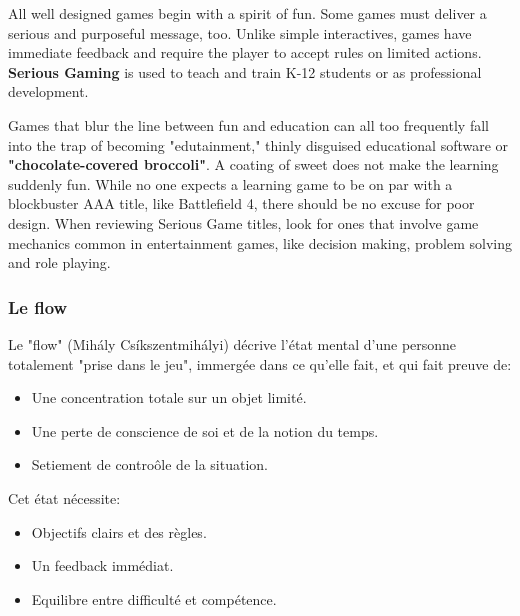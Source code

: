 All well designed games begin with a spirit of fun. Some games must deliver a serious and purposeful message, too. Unlike simple interactives, games have immediate feedback and require the player to accept rules on limited actions. \textbf{Serious Gaming} is used to teach and train K-12 students or as professional development. 

Games that blur the line between fun and education can all too frequently fall into the trap of becoming "edutainment," thinly disguised educational software or \textbf{"chocolate-covered broccoli"}. A coating of sweet does not make the learning suddenly fun. While no one expects a learning game to be on par with a blockbuster AAA title, like Battlefield 4, there should be no excuse for poor design. When reviewing Serious Game titles, look for ones that involve game mechanics common in entertainment games, like decision making, problem solving and role playing.

\subsubsection{Le flow}

Le "flow" (Mih\'aly Cs\'ikszentmih\'alyi) d\'ecrive l'\'etat mental d'une personne totalement "prise dans le jeu", immerg\'ee dans ce qu'elle fait, et qui fait preuve de:

\begin{itemize}
\item Une concentration totale sur un objet limit\'e.
\item Une perte de conscience de soi et de la notion du temps.
\item Setiement de contro\^ole de la situation.
\end{itemize}

Cet \'etat n\'ecessite:

\begin{itemize}
\item Objectifs clairs et des r\`egles.
\item Un feedback imm\'ediat.
\item Equilibre entre difficult\'e et comp\'etence.
\end{itemize}

